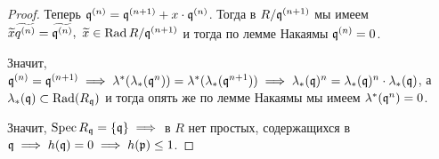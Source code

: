 \begin{proof}
		Теперь $\mathfrak{q}^{(n)} = \mathfrak{q}^{(n + 1)} + x \cdot \mathfrak{q}^{(n)}$. Тогда в $R/\mathfrak{q}^{(n + 1)}$ мы имеем $\widetilde{x} \widetilde{q^{(n)}} = \widetilde{\mathfrak{q}^{(n)}}, \ \widetilde{x} \in \operatorname{Rad}{R/\mathfrak{q}^{(n + 1)}}$ и тогда по лемме Накаямы $\mathfrak{q}^{(n)} = 0$. 

		Значит, $\fq^{(n)} = \fq^{(n + 1)} \implies \lambda^{*}\lr*{\lambda_{*}(\fq^n)} = \lambda^*(\lambda_*(\fq^{n + 1})) \implies \lambda_*(\fq)^n = \lambda_*(\fq)^n \cdot \lambda_*(\fq)$, а $\lambda_*(\mathfrak{q}) \subset \operatorname{Rad}(R_{\mathfrak{q}})$ и тогда опять же по лемме Накаямы мы имеем $\lambda^*(\mathfrak{q}^n) = 0$. 

		Значит, $\operatorname{Spec}{R_{\mathfrak{q}}} = \{ \mathfrak{q} \} \implies $ в $R$ нет простых, содержащихся в $\mathfrak{q} \implies h(\mathfrak{q}) = 0 \implies h(\mathfrak{p}) \le 1$.  
	 \end{proof}